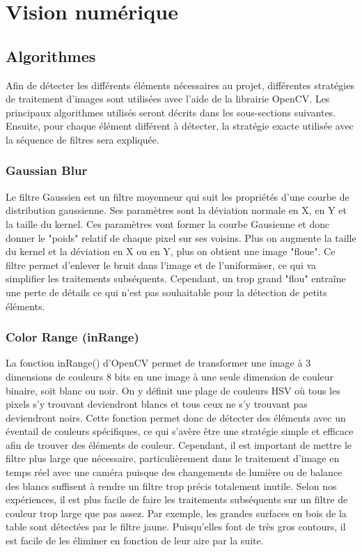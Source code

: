 \chapter{Vision numérique}

\section{Algorithmes}

Afin de détecter les différents éléments nécessaires au projet, différentes stratégies de traitement d'images sont utilisées avec l'aide de la librairie OpenCV. Les principaux algorithmes utilisés seront décrits dans les sous-sections suivantes. Ensuite, pour chaque élément différent à détecter, la stratégie exacte utilisée avec la séquence de filtres sera expliquée.

\subsection{Gaussian Blur}

Le filtre Gaussien est un filtre moyenneur qui suit les propriétés d'une courbe de distribution gaussienne. Ses paramètres sont la déviation normale en X, en Y et la taille du kernel. Ces paramètres vont former la courbe Gausienne et donc donner le "poids" relatif de chaque pixel sur ses voisins. Plus on augmente la taille du kernel et la déviation en X ou en Y, plus on obtient une image "floue". Ce filtre permet d'enlever le bruit dans l'image et de l'uniformiser, ce qui va simplifier les traitements subséquents. Cependant, un trop grand "flou" entraîne une perte de détails ce qui n'est pas souhaitable pour la détection de petits éléments.

\subsection{Color Range (inRange)}

La fonction inRange() d'OpenCV permet de transformer une image à 3 dimensions de couleurs 8 bits en une image à une seule dimension de couleur binaire, soit blanc ou noir. On y définit une plage de couleurs HSV où tous les pixels s'y trouvant deviendront blancs et tous ceux ne s'y trouvant pas deviendront noirs. Cette fonction permet donc de détecter des éléments avec un éventail de couleurs spécifiques, ce qui s'avère être une stratégie simple et efficace afin de trouver des éléments de couleur. Cependant, il est important de mettre le filtre plus large que nécessaire, particulièrement dans le traitement d'image en temps réel avec une caméra puisque des changements de lumière ou de balance des blancs suffisent à rendre un filtre trop précis totalement inutile. Selon nos expériences, il est plus facile de faire les traitements subséquents sur un filtre de couleur trop large que pas assez. Par exemple, les grandes surfaces en bois de la table sont détectées par le filtre jaune. Puisqu'elles font de très gros contours, il est facile de les éliminer en fonction de leur aire par la suite.


